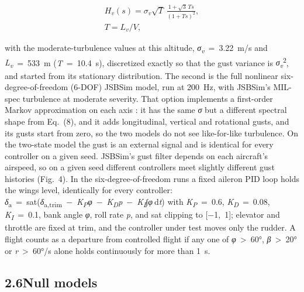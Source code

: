 \documentclass[11pt,letterpaper]{article}
\begin{document}
\[\begin{gathered}H_v(s)=\sigma_v\sqrt{T}\,\frac{1+\sqrt{3}\,Ts}{(1+Ts)^2},\\ T=L_v/V,\end{gathered}\tag{8}\]

\noindent with the moderate-turbulence values at this altitude,
\emph{σ\textsubscript{v}}~=~3.22~m/s and
\emph{L\textsubscript{v}}~=~533~m (\emph{T}~=~10.4~s), discretized
exactly so that the gust variance is
\emph{σ\textsubscript{v}}\textsuperscript{2}, and started from its
stationary distribution. The second is the full nonlinear
six-degree-of-freedom (6-DOF) JSBSim model, run at 200~Hz, with JSBSim's
MIL-spec turbulence at moderate severity. That option implements a
first-order Markov approximation on each axis \cite{yeager1998}: it has
the same \emph{σ} but a different spectral shape from Eq.~(8), and it
adds longitudinal, vertical and rotational gusts, and its gusts start
from zero, so the two models do not see like-for-like turbulence. On the
two-state model the gust is an external signal and is identical for
every controller on a given seed. JSBSim's gust filter depends on each
aircraft's airspeed, so on a given seed different controllers meet
slightly different gust histories (Fig.~4). In the six-degree-of-freedom
runs a fixed aileron PID loop holds the wings level, identically for
every controller:
\emph{δ}\textsubscript{a}~=~sat(\emph{δ}\textsubscript{a,trim}~−~\emph{K\textsubscript{P}φ}~−~\emph{K\textsubscript{D}p}~−~\emph{K\textsubscript{I}}∫\emph{φ} d\emph{t})
with \emph{K\textsubscript{P}}~=~0.6, \emph{K\textsubscript{D}}~=~0.08,
\emph{K\textsubscript{I}}~=~0.1, bank angle \emph{φ}, roll rate
\emph{p}, and sat clipping to {[}−1,~1{]}; elevator and throttle are
fixed at trim, and the controller under test moves only the rudder. A
flight counts as a departure from controlled flight if any one of
\textbar{}\emph{φ}\textbar~\textgreater~60°,
\textbar{}\emph{β}\textbar~\textgreater~20° or
\textbar{}\emph{r}\textbar~\textgreater~60°/s alone holds continuously
for more than 1~s.

\subsection{\texorpdfstring{2.6\quad Null
models}{2.6Null models}}\label{null-models}
\end{document}
